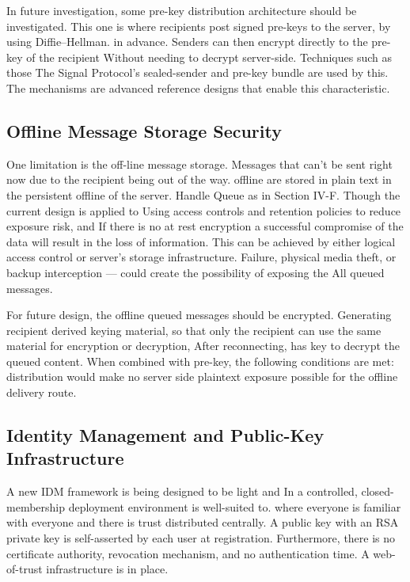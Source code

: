 \documentclass[conference]{IEEEtran}
\begin{document}
In future investigation, some pre-key distribution architecture should be investigated.
This one is where recipients post signed pre-keys to the server, by using Diffie–Hellman.
in advance.  Senders can then encrypt directly to the pre-key of the recipient
Without needing to decrypt server-side.  Techniques such as those
The Signal Protocol's sealed-sender and pre-key bundle are used by this.
The mechanisms are advanced reference designs that enable this characteristic.

\subsection{Offline Message Storage Security}

One limitation is the off-line message storage.
Messages that can't be sent right now due to the recipient being out of the way.
offline are stored in plain text in the persistent offline of the server.
Handle Queue as in Section IV-F.  Though the current design is applied to
Using access controls and retention policies to reduce exposure risk, and
If there is no at rest encryption a successful compromise of the data will result in the loss of information.
This can be achieved by either logical access control or server's storage infrastructure.
Failure, physical media theft, or backup interception — could create the possibility of exposing the
All queued messages.

For future design, the offline queued messages should be encrypted.
Generating recipient derived keying material, so that only the recipient can use the same material for encryption or decryption,
After reconnecting, has key to decrypt the queued
content.  When combined with pre-key, the following conditions are met:
distribution would make no server side plaintext exposure possible for
the offline delivery route.

\subsection{Identity Management and Public-Key Infrastructure}

A new IDM framework is being designed to be light and
In a controlled, closed-membership deployment environment is well-suited to.
where everyone is familiar with everyone and there is trust distributed
centrally.  A public key with an RSA private key is self-asserted by each user at registration.
Furthermore, there is no certificate authority, revocation mechanism, and no authentication time.
A web-of-trust infrastructure is in place.
\end{document}
